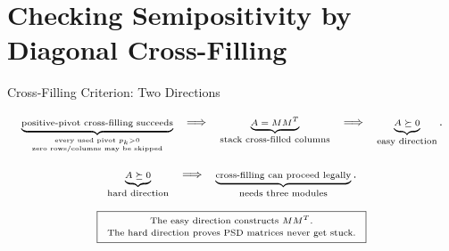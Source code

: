 \documentclass[10pt]{beamer}
\theoremstyle{definition}
\begin{document}
\section{Checking Semipositivity by Diagonal Cross-Filling}


\begin{frame}[shrink=8]{Cross-Filling Criterion: Two Directions}

\[
\scriptsize
\underbrace{\text{positive-pivot cross-filling succeeds}}_{\substack{\text{every used pivot }p_k>0\\\text{zero rows/columns may be skipped}}}
\quad\Longrightarrow\quad
\underbrace{A=MM^T}_{\text{stack cross-filled columns}}
\quad\Longrightarrow\quad
\underbrace{A\succeq0}_{\text{easy direction}}.
\]

\vfill

\[
\scriptsize
\underbrace{A\succeq0}_{\text{hard direction}}
\quad\Longrightarrow\quad
\underbrace{\text{cross-filling can proceed legally}}_{\text{needs three modules}}.
\]

\vfill

\[
\scriptsize
\boxed{
\begin{array}{c}
\text{The easy direction constructs }MM^T.\\[0.2em]
\text{The hard direction proves PSD matrices never get stuck.}
\end{array}}
\]

\end{frame}
\end{document}
